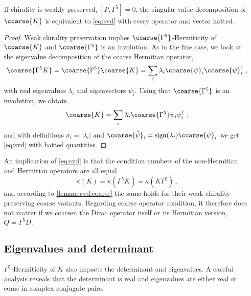 \begin{lemma} \label{lemma:svd:coarse}
If chirality is weakly preserved, $[P, \Gamma^5]=0$, the singular value decomposition of $\coarse{K}$ is equivalent to \cref{eq:svd} with every operator and vector hatted.
\end{lemma}

\begin{proof}
Weak chirality preservation implies $\coarse{\Gamma^{5}}$-Hermiticity of $\coarse{K}$ and $\coarse{\Gamma^{5}}$ is an involution.
As in the fine case, we look at the eigenvalue decomposition of the coarse Hermitian operator,
\begin{equation}
\coarse{\Gamma^{5} K} = \coarse{\Gamma^{5}} \coarse{K} = \sum_{i} \lambda_i \coarse{\psi}_i \coarse{\psi}_i^{\dagger} \;,
\end{equation}
with real eigenvalues $\lambda_i$ and eigenvectors $\psi_i$. Using that $\coarse{\Gamma^{5}}$ is an involution, we obtain
\begin{equation}
\coarse{K} = \sum_{i} \lambda_i \coarse{\Gamma^{5}} \psi_i \psi_i^{\dagger} \;,
\end{equation}
and with definitions $\sigma_i = \lvert \lambda_i \rvert$ and $\coarse{\tilde{\psi}}_i = \text{sign}(\lambda_i) \coarse{\psi}_i$ we get \cref{eq:svd} with hatted quantities.
\end{proof}

An implication of \cref{eq:svd} is that the condition numbers of the non-Hermitian and Hermitian operators are all equal
\begin{equation}
\kappa(K) = \kappa(\Gamma^{5} K) = \kappa(K \Gamma^{5}) \,,
\end{equation}
and according to \cref{lemma:svd:coarse} the same holds for their weak chirality preserving coarse variants.
Regarding coarse operator condition, it therefore does not matter if we coarsen the Dirac operator itself or its Hermitian version, $Q=\Gamma^{5} D$.

\subsection{Eigenvalues and determinant}

$\Gamma^{5}$-Hermiticity of $K$ also impacts the determinant and eigenvalues.
A careful analysis reveals that the determinant is real and eigenvalues are either real or come in complex conjugate pairs.


